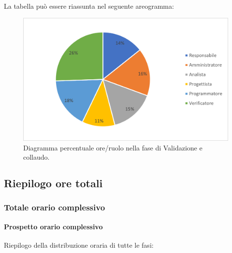 La tabella può essere riassunta nel seguente areogramma:
\begin{figure}[H]
	\centering
	\includegraphics[width=0.8\linewidth]{res/images/preventivo/7-2.png}
	\caption{Diagramma percentuale ore/ruolo nella fase di Validazione e collaudo.}
	\label{fig:diagramma costi ruolo fase Validazione e collaudo.}
\end{figure}

\subsection{Riepilogo ore totali}
\subsubsection{Totale orario complessivo}
\paragraph{Prospetto orario complessivo}
Riepilogo della distribuzione oraria di tutte le fasi:

